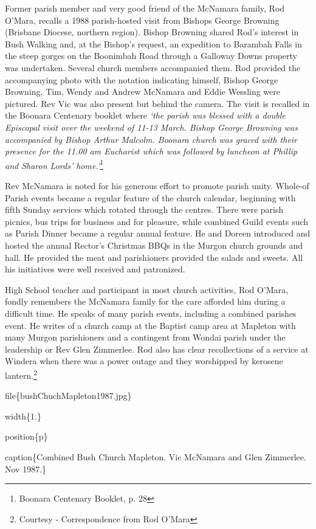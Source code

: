Former parish member and very good friend of the McNamara family, Rod O'Mara, recalls a 1988 parish-hosted visit from Bishops George Browning (Brisbane Diocese, northern region). Bishop Browning shared Rod's interest in Bush Walking and, at the Bishop's request, an expedition to Barambah Falls in the steep gorges on the Boonimbah Road through a Galloway Downs property was undertaken. Several church members accompanied them. Rod provided the accompanying photo with the notation indicating himself, Bishop George Browning, Tim, Wendy and Andrew McNamara and Eddie Wessling were pictured. Rev Vic was also present but behind the camera. The visit is recalled in the Boonara Centenary booklet where \emph{`the parish was blessed with a double Episcopal visit over the weekend of 11-13 March. Bishop George Browning was accompanied by Bishop Arthur Malcolm. Boonara church was graced with their presence for the 11.00 am Eucharist which was followed by luncheon at Phillip and Sharon Lords' home.'}\footnote{Boonara Centenary Booklet, p. 28}

Rev McNamara is noted for his generous effort to promote parish unity. Whole-of Parish events became a regular feature of the church calendar, beginning with fifth Sunday services which rotated through the centres. There were parish picnics, bus trips for business and for pleasure, while combined Guild events such as Parish Dinner became a regular annual feature. He and Doreen introduced and hosted the annual Rector's Christmas BBQs in the Murgon church grounds and hall. He provided the meat and parishioners provided the salads and sweets. All his initiatives were well received and patronized.

High School teacher and participant in most church activities, Rod O'Mara, fondly remembers the McNamara family for the care afforded him during a difficult time. He speaks of many parish events, including a combined parishes event. He writes of a church camp at the Baptist camp area at Mapleton with many Murgon parishioners and a contingent from Wondai parish under the leadership or Rev Glen Zimmerlee. Rod also has clear recollections of a service at Windera when there was a power outage and they worshipped by kerosene lantern.\footnote{Courtesy - Correspondence from Rod O'Mara}

file\{bushChuchMapleton1987.jpg\}

width\{1.\}

position\{p\}

caption\{Combined Bush Church Mapleton. Vic McNamara and Glen Zimmerlee. Nov 1987.\}

